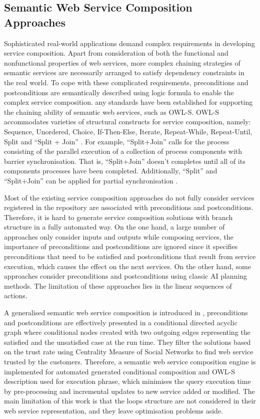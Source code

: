 \subsection{Semantic Web Service Composition Approaches}\label{Semantic}
Sophisticated real-world applications demand complex requirements in developing service composition. Apart from consideration of both the functional and nonfunctional properties of web services, more complex chaining strategies of semantic services are necessarily arranged to satisfy dependency constraints in the real world. To cope with these complicated requirements, preconditions and postconditions are semantically described using logic formula to enable the complex service composition. any standards have been established for supporting the chaining ability of semantic web services, such as OWL-S. OWL-S accommodates varieties of structural constructs for service composition, namely: Sequence, Unordered, Choice, If-Then-Else, Iterate, Repeat-While, Repeat-Until, Split and ``Split + Join'' \cite{wang2014automated}. For example, ``Split+Join'' calls for the process consisting of the parallel execution of a collection of process components with barrier synchronisation. That is, ``Split+Join'' doesn't completes until all of its components processes have been completed. Additionally, ``Split'' and ``Split+Join'' can be applied for partial synchronisation \cite{wang2014automated}.

Most of the existing service composition approaches do not fully consider services registered in the repository are associated with preconditions and postconditions.  Therefore, it is hard to generate service composition solutions with branch structure in a fully automated way. On the one hand,  a large number of approaches \cite{} only consider inputs and outputs while composing services, the importance of preconditions and postconditions are ignored since it specifies preconditions that need to be satisfied and postconditions that result from service execution,  which causes the effect on the next services. On the other hand, some approaches consider preconditions and postconditions using classic AI planning methods. The limitation of these approaches lies in the linear sequences of actions.


A generalised semantic web service composition is introduced in \cite{bansal2016generalized}, preconditions and postconditions are effectively presented in a conditional directed acyclic graph where conditional nodes created with two outgoing edges representing the satisfied and the unsatisfied case at the run time. They filter the solutions based on the trust rate using Centrality Measure of Social Networks to find web service trusted by the customers. Therefore, a semantic web service composition engine is implemented for automated generated conditional composition and OWL-S description used for execution phrase, which minimises the query execution time by pre-processing and incremental updates to new service added or modified. The main limitation of this work is that the loops structure are not considered in their web service representation, and they leave optimisation problems aside. 

